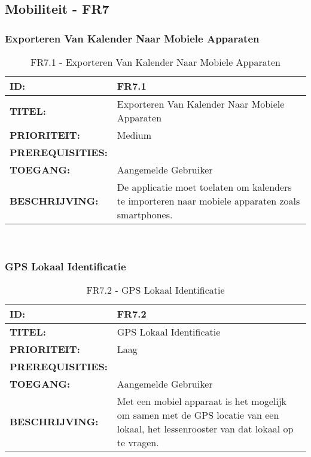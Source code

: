 \subsection{Mobiliteit - FR7}

\subsubsection{Exporteren Van Kalender Naar Mobiele Apparaten}
\noindent\begin{table}[H]
            \begin{tabular}{l | p{10cm}}
                \textbf{ID:} & FR7.1 \\ \hline
                \textbf{TITEL:} & Exporteren Van Kalender Naar Mobiele Apparaten\\ \hline
                \textbf{PRIORITEIT:} &  Medium \\ \hline
                \textbf{PREREQUISITIES:} & \\ \hline
                \textbf{TOEGANG:} & Aangemelde Gebruiker \\ \hline
                \textbf{BESCHRIJVING:} & De applicatie moet toelaten om kalenders te importeren naar mobiele apparaten zoals smartphones.\\ 
            \end{tabular}\\
            \caption{FR7.1 - Exporteren Van Kalender Naar Mobiele Apparaten}
            \label{tab:FR7.1 - Exporteren Van Kalender Naar Mobiele Apparaten}
        \end{table}
        
\subsubsection{GPS Lokaal Identificatie} 
\noindent\begin{table}[H]
            \begin{tabular}{l | p{10cm}}
                \textbf{ID:} & FR7.2 \\ \hline
                \textbf{TITEL:} & GPS Lokaal Identificatie\\ \hline
                \textbf{PRIORITEIT:} &  Laag \\ \hline
                \textbf{PREREQUISITIES:} & \\ \hline
                \textbf{TOEGANG:} & Aangemelde Gebruiker \\ \hline
                \textbf{BESCHRIJVING:} & Met een mobiel apparaat is het mogelijk om samen met de GPS locatie van een lokaal, het lessenrooster van dat lokaal op te vragen.\\ 
            \end{tabular}\\
            \caption{FR7.2 - GPS Lokaal Identificatie}
            \label{tab:FR7.2 - GPS Lokaal Identificatie}
        \end{table}


